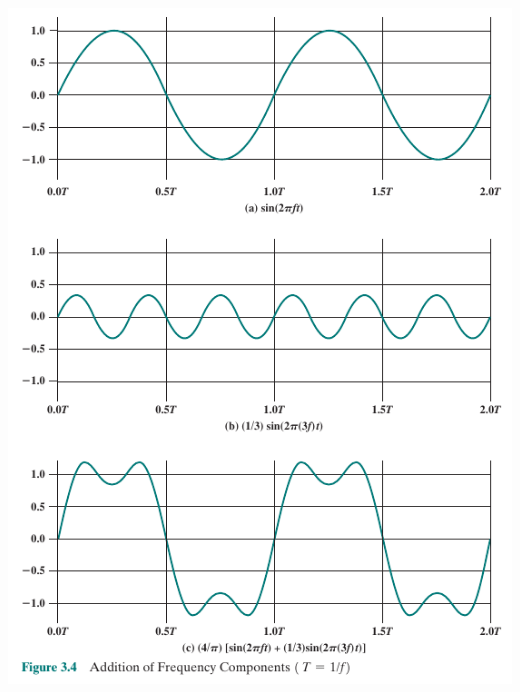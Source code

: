 \documentclass[pdflatex,compress]{beamer}
\begin{document}
\begin{frame}
	\begin{center}
		\includegraphics[height=0.9\textheight]{img/img04}
	\end{center}
\end{frame}
\end{document}
